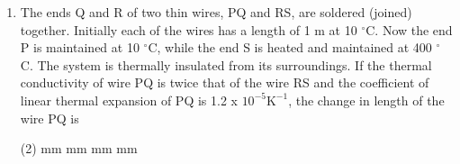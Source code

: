 
\begin{enumerate}
    \item The ends Q and R of two thin wires, PQ and RS, are soldered (joined) together. Initially each of the wires has a length of 1 m at 10 \(^\circ\)C. Now the end P is maintained at 10 \(^\circ\)C, while the end S is heated and maintained at 400 \(^\circ\)C. The system is thermally insulated from its surroundings. If the thermal conductivity of wire PQ is twice that of the wire RS and the coefficient of linear thermal expansion of PQ is 1.2 x \(10^{-5} \text{K}^{-1}\), the change in length of the wire PQ is
        \begin{tasks}(2)
             mm
             mm
             mm
             mm
        \end{tasks}
\end{enumerate}
